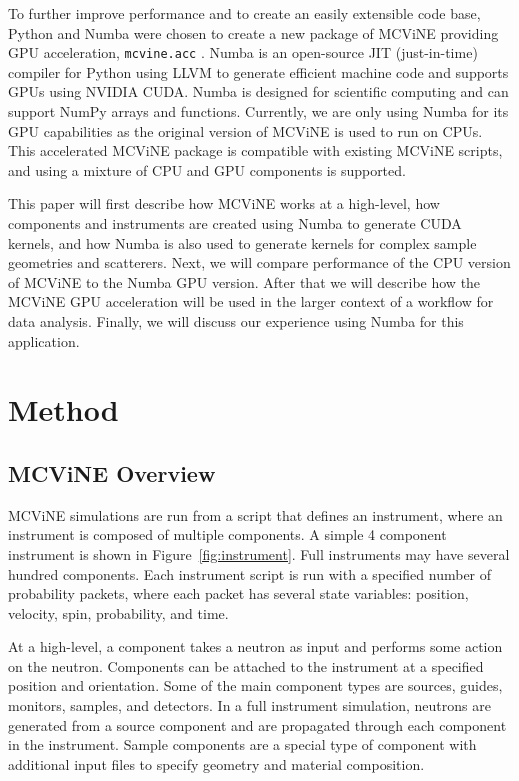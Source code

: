 To further improve performance and to create an easily extensible code base, Python and Numba\cite{lam2015numba} were chosen to create a new package of MCViNE providing GPU acceleration, \texttt{mcvine.acc} \cite{Lin_mcvine_acc}. Numba is an open-source JIT (just-in-time) compiler for Python using LLVM to generate efficient machine code and supports GPUs using NVIDIA CUDA. Numba is designed for scientific computing and can support NumPy arrays and functions. Currently, we are only using Numba for its GPU capabilities as the original version of MCViNE is used to run on CPUs. This accelerated MCViNE package is compatible with existing MCViNE scripts, and using a mixture of CPU and GPU components is supported.

This paper will first describe how MCViNE works at a high-level, how components and instruments are created using Numba to generate CUDA kernels, and how Numba is also used to generate kernels for complex sample geometries and scatterers. 
Next, we will compare performance of the CPU version of MCViNE to the Numba GPU version.
After that we will describe how the MCViNE GPU acceleration will be used in the larger context of a workflow for data analysis. 
Finally, we will discuss our experience using Numba for this application.


\section{Method}

\subsection{MCViNE Overview}

MCViNE simulations are run from a script that defines an instrument, where an instrument is composed of multiple components. A simple 4 component instrument is shown in Figure~\ref{fig:instrument}. Full instruments may have several hundred components. Each instrument script is run with a specified number of probability packets, where each packet has several state variables: position, velocity, spin, probability, and time.

At a high-level, a component takes a neutron as input and performs some action on the neutron. Components can be attached to the instrument at a specified position and orientation. Some of the main component types are sources, guides, monitors, samples, and detectors. In a full instrument simulation, neutrons are generated from a source component and are propagated through each component in the instrument. Sample components are a special type of component with additional input files to specify geometry and material composition.

